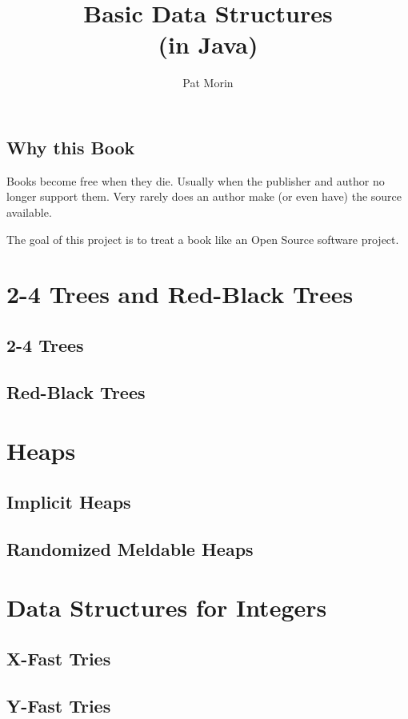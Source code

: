 \documentclass[11pt]{book}
\title{Basic Data Structures\\(in Java)}
\author{Pat Morin}
\begin{document}
\begin{titlepage}
  \maketitle
  \thispagestyle{empty}
\end{titlepage}

\tableofcontents

\section*{Why this Book}

Books become free when they die.  Usually when the publisher and author
no longer support them.  Very rarely does an author make (or even have)
the source available.

The goal of this project is to treat a book like an Open Source software
project.











\chapter{2-4 Trees and Red-Black Trees}
\section{2-4 Trees}
\section{Red-Black Trees}

\chapter{Heaps}
\section{Implicit Heaps}
\section{Randomized Meldable Heaps}

\chapter{Data Structures for Integers}
\section{X-Fast Tries}
\section{Y-Fast Tries}
\end{document}

